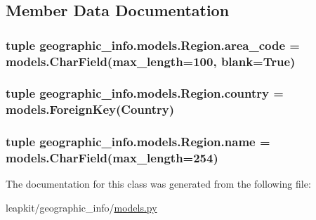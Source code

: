 \subsection{Member Data Documentation}
\hypertarget{classgeographic__info_1_1models_1_1_region_aa23284811d00b9d83b47d2393fff16a4}{
\subsubsection[{area\-\_\-code}]{\setlength{\rightskip}{0pt plus 5cm}tuple geographic\-\_\-info.\-models.\-Region.\-area\-\_\-code = models.\-Char\-Field(max\-\_\-length=100, blank=True)\hspace{0.3cm}{\ttfamily [static]}}}\label{classgeographic__info_1_1models_1_1_region_aa23284811d00b9d83b47d2393fff16a4}
\hypertarget{classgeographic__info_1_1models_1_1_region_a9d82e4d13b0fe7f0efeec8ba374569c9}{
\subsubsection[{country}]{\setlength{\rightskip}{0pt plus 5cm}tuple geographic\-\_\-info.\-models.\-Region.\-country = models.\-Foreign\-Key({\bf Country})\hspace{0.3cm}{\ttfamily [static]}}}\label{classgeographic__info_1_1models_1_1_region_a9d82e4d13b0fe7f0efeec8ba374569c9}
\hypertarget{classgeographic__info_1_1models_1_1_region_a5dc5da2f74af6b51c99842bdbeb7315d}{
\subsubsection[{name}]{\setlength{\rightskip}{0pt plus 5cm}tuple geographic\-\_\-info.\-models.\-Region.\-name = models.\-Char\-Field(max\-\_\-length=254)\hspace{0.3cm}{\ttfamily [static]}}}\label{classgeographic__info_1_1models_1_1_region_a5dc5da2f74af6b51c99842bdbeb7315d}


The documentation for this class was generated from the following file\-:\begin{DoxyCompactItemize}
\item 
leapkit/geographic\-\_\-info/\hyperlink{geographic__info_2models_8py}{models.\-py}\end{DoxyCompactItemize}
